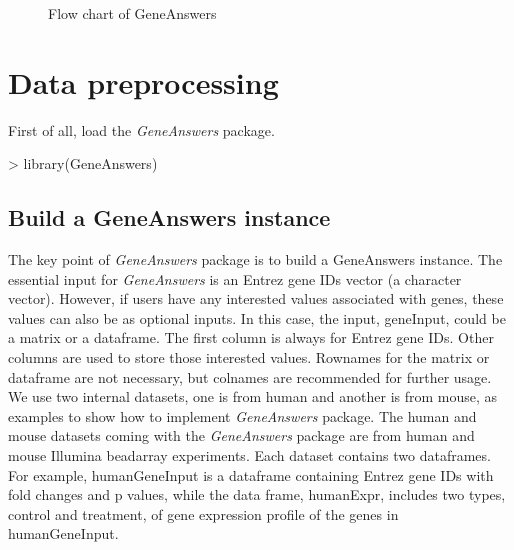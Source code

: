 \documentclass[a4paper]{article}
\newcommand{\Rpackage}[1]{{\textit{#1}}}
\begin{document}
\begin{figure}
\centering
\centering
{}
\caption{Flow chart of GeneAnswers}
\label{conceptgeneNetwork}
\end{figure}
\section{Data preprocessing}

First of all, load the \Rpackage{GeneAnswers} package.
\begin{Schunk}
\begin{Sinput}
> library(GeneAnswers)
\end{Sinput}
\end{Schunk}

\subsection{Build a GeneAnswers instance}
The key point of \Rpackage{GeneAnswers} package is to build a GeneAnswers instance. The essential input for \Rpackage{GeneAnswers} is an Entrez gene IDs vector (a character vector). However, if users have any interested values associated with genes, these values can also be as optional inputs. In this case,  the input, geneInput, could be a matrix or a dataframe. The first column is always for Entrez gene IDs. Other columns are used to store those interested values. Rownames for the matrix or dataframe are not necessary, but colnames are recommended for further usage. We use two internal datasets, one is from human and another is from mouse, as examples to show how to implement \Rpackage{GeneAnswers} package. The human and mouse datasets coming with the \Rpackage{GeneAnswers} package are  from human and mouse Illumina beadarray experiments. Each dataset contains two dataframes. For example, humanGeneInput is a dataframe  containing Entrez gene IDs with fold changes and p values, while the data frame, humanExpr, includes two types, control and treatment, of gene expression profile of the genes in humanGeneInput.
\end{document}
